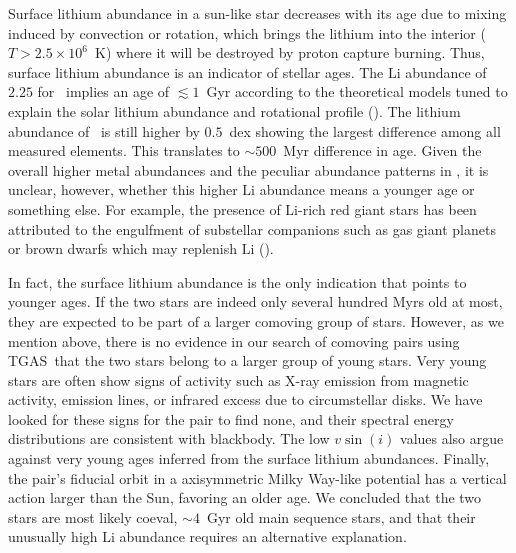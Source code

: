 \documentclass[manuscript]{aastex6}
\newcommand{\acronym}[1]{{\small{#1}}}
\newcommand{\tgas}{\acronym{TGAS}}
\newcommand*\elem[1]{\ensuremath{\mathrm{#1}}}
\newcommand{\sunanalog}{\text{Krios}}
\newcommand{\bizarreone}{\text{Kronos}}
\begin{document}
Surface lithium abundance in a sun-like star decreases with its age due to
mixing induced by convection or rotation, which brings the lithium into the
interior ($T>2.5 \times 10^{6}$~K) where it will be destroyed by proton capture
burning.
Thus, surface lithium abundance is an indicator of stellar ages.
The $\elem{Li}$ abundance of $2.25$ for \sunanalog\ implies an age of $\lesssim
1$~Gyr according to the theoretical models tuned to explain the solar lithium
abundance and rotational profile (\citealt{2005Sci...309.2189C}).
The lithium abundance of \bizarreone\ is still higher by $0.5$~dex showing the
largest difference among all measured elements.
This translates to $\sim 500$~Myr difference in age.
Given the overall higher metal abundances and the peculiar abundance patterns
in \bizarreone, it is unclear, however, whether this higher $\elem{Li}$
abundance means a younger age or something else.
For example, the presence of $\elem{Li}$-rich red giant stars has been
attributed to the engulfment of substellar companions such as gas giant planets
or brown dwarfs which may replenish $\elem{Li}$ (\citealt{Casey:2016aa}).

In fact, the surface lithium abundance is the only indication that points to younger ages.
If the two stars are indeed only several hundred Myrs old at most,
they are expected to be part of a larger comoving group of stars.
However, as we mention above, there is no evidence in our search of comoving pairs
using \tgas\ that the two stars belong to a larger group of young stars.
Very young stars are often show signs of activity such as
X-ray emission from magnetic activity, emission lines, or infrared excess due to
circumstellar disks.
We have looked for these signs for the pair to find none, and their spectral energy
distributions are consistent with blackbody.
The low $v\sin(i)$ values also argue against very young ages inferred from the
surface lithium abundances.
Finally, the pair's fiducial orbit in a axisymmetric Milky Way-like potential
has a vertical action larger than the Sun, favoring an older age.
We concluded that the two stars are most likely coeval, $\sim 4$~Gyr old main
sequence stars, and that their unusually high \elem{Li} abundance requires an
alternative explanation.
\end{document}
